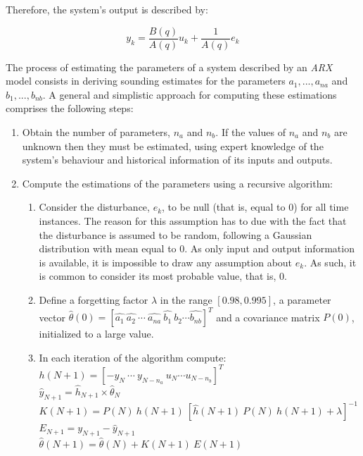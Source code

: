 \documentclass[12pt]{article}
\begin{document}
Therefore, the system's output is described by:

$$y_{k} = \frac{B(q)}{A(q)} u_{k} + \frac{1}{A(q)} e_{k} $$

The process of estimating the parameters of a system described by an \emph{ARX} model consists in deriving sounding estimates for the parameters $a_{1}, ... , a_{na}$ and $b_{1}, ... , b_{nb}$. A general and simplistic approach for computing these estimations comprises the following steps:

\begin{enumerate}
	\item Obtain the number of parameters, $n_{a}$ and $n_{b}$. If the values of $n_{a}$ and $n_{b}$ are unknown then they must be estimated, using expert knowledge of the system's behaviour and historical information of its inputs and outputs.
	
	\item Compute the estimations of the parameters using a recursive algorithm:
	\begin{enumerate}
		\item Consider the disturbance, $e_{k}$, to be null (that is, equal to 0) for all time instances. The reason for this assumption has to due with the fact that the disturbance is assumed to be random, following a Gaussian distribution with mean equal to 0. As only input and output information is available, it is impossible to draw any assumption about $e_{k}$. As such, it is common to consider its most probable value, that is, 0.
		
		\item Define a forgetting factor $\lambda$ in the range $[0.98, 0.995]$, a parameter vector $\hat{\theta}(0) = [\hat{a_{1}} \: \hat{a_{2}} \: \cdots \: \hat{a_{na}} \: \hat{b_{1}} \: \hat{b_{2}} \cdots \hat{b_{nb}}]^{T}$ and a covariance matrix $P(0)$, initialized to a large value.
		
		\item In each iteration of the algorithm compute: \\ $h(N+1) = [-y_{N} \: \cdots \: y_{N-n_{a}} \: u_{N} \cdots u_{N-n_{b}}]^{T}$ \\ $\hat{y}_{N+1} = \hat{h}_{N+1} \times \hat{\theta}_{N}$\\ $K(N+1) = P(N) \: h(N+1) \: [\hat{h}(N+1) \: P(N) \: h(N+1) + \lambda]^{-1}$\\ $E_{N+1} = y_{N+1} - \hat{y}_{N+1}$\\ $\hat{\theta}(N+1) = \hat{\theta}(N) + K(N+1) \: E(N+1)$
	\end{enumerate}
\end{enumerate}
\end{document}

